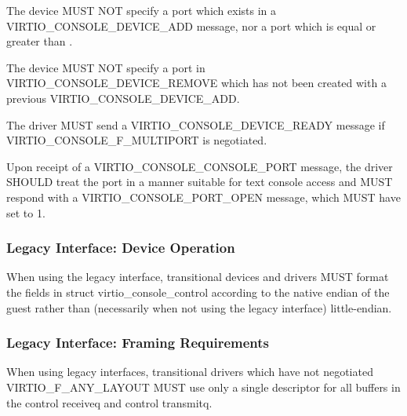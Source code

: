 
The device MUST NOT specify a port which exists in a
VIRTIO_CONSOLE_DEVICE_ADD message, nor a port which is equal or
greater than .

The device MUST NOT specify a port in VIRTIO_CONSOLE_DEVICE_REMOVE
which has not been created with a previous VIRTIO_CONSOLE_DEVICE_ADD.


The driver MUST send a VIRTIO_CONSOLE_DEVICE_READY message if
VIRTIO_CONSOLE_F_MULTIPORT is negotiated.

Upon receipt of a VIRTIO_CONSOLE_CONSOLE_PORT message, the driver
SHOULD treat the port in a manner suitable for text console access
and MUST respond with a VIRTIO_CONSOLE_PORT_OPEN message, which MUST
have  set to 1.

\subsubsection{Legacy Interface: Device Operation}\label{sec:Device Types / Console Device / Device Operation / Legacy Interface: Device Operation}
When using the legacy interface, transitional devices and drivers
MUST format the fields in struct virtio_console_control
according to the native endian of the guest rather than
(necessarily when not using the legacy interface) little-endian.

\subsubsection{Legacy Interface: Framing Requirements}\label{sec:Device
Types / Console Device / Legacy Interface: Framing Requirements}

When using legacy interfaces, transitional drivers which have not
negotiated VIRTIO_F_ANY_LAYOUT MUST use only a single
descriptor for all buffers in the control receiveq and control transmitq.

